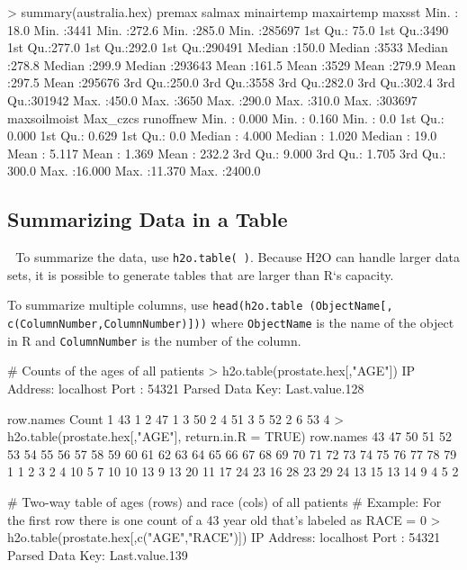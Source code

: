 \documentclass[11pt]{article}
\begin{document}
{\begin{spverbatim}
> summary(australia.hex)
 premax          salmax         minairtemp      maxairtemp      maxsst          
 Min.   : 18.0   Min.   :3441   Min.   :272.6   Min.   :285.0   Min.   :285697  
 1st Qu.: 75.0   1st Qu.:3490   1st Qu.:277.0   1st Qu.:292.0   1st Qu.:290491  
 Median :150.0   Median :3533   Median :278.8   Median :299.9   Median :293643  
 Mean   :161.5   Mean   :3529   Mean   :279.9   Mean   :297.5   Mean   :295676  
 3rd Qu.:250.0   3rd Qu.:3558   3rd Qu.:282.0   3rd Qu.:302.4   3rd Qu.:301942  
 Max.   :450.0   Max.   :3650   Max.   :290.0   Max.   :310.0   Max.   :303697  
 maxsoilmoist     Max_czcs         runoffnew       
 Min.   : 0.000   Min.   : 0.160   Min.   :   0.0  
 1st Qu.: 0.000   1st Qu.: 0.629   1st Qu.:   0.0  
 Median : 4.000   Median : 1.020   Median :  19.0  
 Mean   : 5.117   Mean   : 1.369   Mean   : 232.2  
 3rd Qu.: 9.000   3rd Qu.: 1.705   3rd Qu.: 300.0  
 Max.   :16.000   Max.   :11.370   Max.   :2400.0  
\end{spverbatim}


\subsection{Summarizing Data in a Table} 
To summarize the data, use {\texttt{h2o.table( )}}. Because H2O can handle larger data sets, it is possible to generate tables that are larger than R`s capacity. 

To summarize multiple columns, use {\texttt{head(h2o.table (ObjectName[, c(ColumnNumber,ColumnNumber)]))}} where {\texttt{ObjectName}} is the name of the object in R and {\texttt{ColumnNumber}} is the number of the column. 

\begin{spverbatim}
# Counts of the ages of all patients
> h2o.table(prostate.hex[,"AGE"])
IP Address: localhost 
Port      : 54321 
Parsed Data Key: Last.value.128 

  row.names Count
1        43     1
2        47     1
3        50     2
4        51     3
5        52     2
6        53     4
> h2o.table(prostate.hex[,"AGE"], return.in.R = TRUE)
row.names
43 47 50 51 52 53 54 55 56 57 58 59 60 61 62 63 64 65 66 67 68 69 70 71 72 73 74 75 76 77 78 79 
 1  1  2  3  2  4 10  5  7 10 10 13  9 13 20 11 17 24 23 16 28 23 29 24 13 15 13 14  9  4  5  2 

# Two-way table of ages (rows) and race (cols) of all patients
# Example: For the first row there is one count of a 43 year old that's labeled as RACE = 0
> h2o.table(prostate.hex[,c("AGE","RACE")])
IP Address: localhost 
Port      : 54321 
Parsed Data Key: Last.value.139 


\end{spverbatim}}
\end{document}
